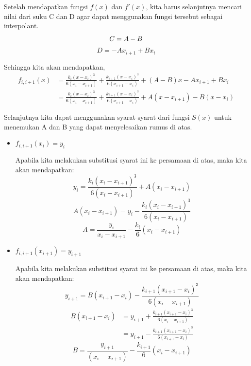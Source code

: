 \documentclass[journal,12pt,onecolumn,a4paper]{IEEEtran}
\begin{document}
Setelah mendapatkan fungsi \(f(x)\) dan \(f'(x)\), kita harus selanjutnya mencari nilai dari suku C dan D agar dapat menggunakan fungsi tersebut sebagai interpolant.
\begin{equation}
	C = A - B\\
\end{equation}
\begin{equation}
	D = -Ax_{i+1} + Bx_i
\end{equation}

Sehingga kita akan mendapatkan,
\begin{equation}
	\begin{split}
		f_{i, i+1}(x) & = \frac{k_i(x-x_i)^3}{6(x_i - x_{i+1})} + \frac{k_{i+1}(x - x_i)^3}{6(x_{i+1} - x_i)} + (A-B)x - Ax_{i+1} + Bx_i\\
		& = \frac{k_i(x-x_i)^3}{6(x_i - x_{i+1})} + \frac{k_{i+1}(x - x_i)^3}{6(x_{i+1} - x_i)} + A(x-x_{i+1}) - B(x-x_i)
	\end{split}
\end{equation}

Selanjutnya kita dapat menggunakan syarat-syarat dari fungsi \(S(x)\) untuk menemukan A dan B yang dapat menyelesaikan rumus di atas.

\begin{itemize}
	\item
	      \(f_{i, i+1}(x_i) = y_i\)

	      Apabila kita melakukan substitusi syarat ini ke persamaan di atas, maka kita akan mendapatkan:
	      \begin{equation*}
		      y_i = \frac{k_i(x_i - x_{i+1})^3}{6(x_i - x_{i+1})} + A(x_i - x_{i+1})
	      \end{equation*}
	      \begin{equation*}
		      A(x_i - x_{i+1}) = y_i - \frac{k_i(x_i - x_{i+1})^3}{6(x_i - x_{i+1})}
	      \end{equation*}
	      \begin{equation}
		      A = \frac{y_i}{x_i - x_{i+1}} - \frac{k_i}{6}(x_i - x_{i+1})
	      \end{equation}

	\item
	      \(f_{i, i+1}(x_{i+1}) = y_{i+1}\)

	      Apabila kita melakukan substitusi syarat ini ke persamaan di atas, maka kita akan mendapatkan:
	      \begin{equation*}
		      y_{i+1} = B(x_{i+1} - x_i) - \frac{k_{i+1}(x_{i+1}-x_i)^3}{6(x_i - x_{i + 1})}
	      \end{equation*}
	      \begin{equation*}
		      \begin{split}
			      B(x_{i+1} - x_i) & = y_{i+1} + \frac{k_{i+1}(x_{i+1}-x_i)^3}{6(x_i - x_{i + 1})}\\
			      & = y_{i+1} - \frac{k_{i+1}(x_{i+1}-x_i)^3}{6(x_{i + 1} - x_i)}
		      \end{split}
	      \end{equation*}
	      \begin{equation}
		      B = \frac{y_{i+1}}{(x_i - x_{i+1})} - \frac{k_{i+1}}{6}(x_i - x_{i+1})
	      \end{equation}
\end{itemize}
\end{document}
